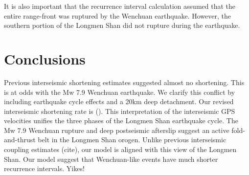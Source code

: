 \documentclass{article}
\begin{document}
It is also important that the recurrence interval calculation assumed that the entire range-front was ruptured by the Wenchuan earthquake.
However, the southern portion of the Longmen Shan did not rupture during the earthquake. 

\section{Conclusions}
Previous interseismic shortening estimates suggested almost no shortening. This is at odds with the Mw 7.9 Wenchuan earthquake. We clarify this conflict by including earthquake cycle effects and a 20km deep detachment. Our revised interseismic shortening rate is ().
This interpretation of the interseismic GPS velocities unifies the three phases of the Longmen Shan earthquake cycle. The Mw 7.9 Wenchuan rupture and deep postseismic afterslip suggest an active fold-and-thrust belt in the Longmen Shan orogen. Unlike previous interseismic coupling estimates (cite), our model is aligned with this view of the Longmen Shan. 
Our model suggest that Wenchuan-like events have much shorter recurrence intervals. Yikes!
\end{document}
